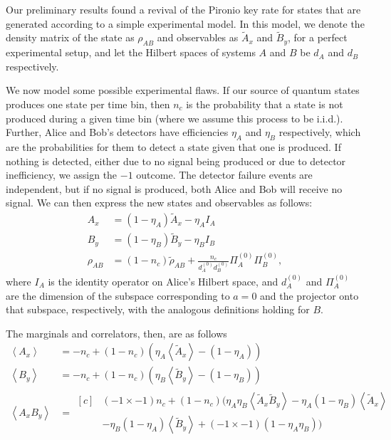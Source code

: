 \documentclass[10pt, a4paper]{article}
\newcommand{\?}{\mathrel{?}} %
\newcommand{\angleb}[1]{\left\langle #1 \right\rangle} %
\numberwithin{equation}{section} %
\theoremstyle{definition}
\theoremstyle{plain}
\theoremstyle{plain}
\begin{document}
  Our preliminary results found a revival of the Pironio key rate for states that are generated according to a simple experimental model. In this model, we denote the density matrix of the state as \(\rho_{AB}\) and observables as \(\tilde{A}_x\) and \(\tilde{B}_y\), for a perfect experimental setup, and let the Hilbert spaces of systems \(A\) and \(B\) be \(d_A\) and \(d_B\) respectively.

  We now model some possible experimental flaws. If our source of quantum states produces one state per time bin, then \(n_c\) is the probability that a state is not produced during a given time bin (where we assume this process to be i.i.d.). Further, Alice and Bob's detectors have efficiencies \(\eta_A\) and \(\eta_B\) respectively, which are the probabilities for them to detect a state given that one is produced. If nothing is detected, either due to no signal being produced or due to detector inefficiency, we assign the \(-1\) outcome. The detector failure events are independent, but if no signal is produced, both Alice and Bob will receive no signal. We can then express the new states and observables as follows:
  \begin{align*}
    A_x &= (1-\eta_A)\tilde{A}_x - \eta_A I_A \\
    B_y &= (1-\eta_B)\tilde{B}_y - \eta_B I_B \\
    \rho_{AB} &= (1-n_c)\tilde{\rho}_{AB} + \frac{n_c}{d^{(0)}_A d^{(0)}_B} \Pi_A^{(0)} \Pi_B^{(0)},
  \end{align*}
  where \(I_A\) is the identity operator on Alice's Hilbert space, and \(d_A^{(0)}\) and \(\Pi_A^{(0)}\) are the dimension of the subspace corresponding to \(a={0}\) and the projector onto that subspace, respectively, with the analogous definitions holding for \(B\).

  The marginals and correlators, then, are as follows
  \begin{align*}
    \angleb{A_x} &= -n_c + (1-n_c)(\eta_A\angleb{\tilde{A}_x} - (1-\eta_A)) \\
    \angleb{B_y} &= -n_c + (1-n_c)(\eta_B\angleb{\tilde{B}_y} - (1-\eta_B)) \\
    \angleb{A_x B_y} &= \begin{aligned}[c]
      & (-1\times-1) n_c + (1-n_c)(\eta_A\eta_B\angleb{\tilde{A}_x\tilde{B}_y} - \eta_A(1-\eta_B)\angleb{\tilde{A}_x} \\
      & -\eta_B(1-\eta_A)\angleb{\tilde{B}_y} + (-1\times-1) (1-\eta_A\eta_B) )
    \end{aligned}
    \end{align*}
\end{document}
